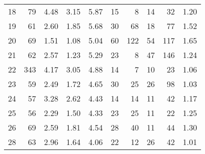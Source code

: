 \begin{tabular}{rrrrrrrrrr}
18 &       79 &                             4.48 &                             3.15 &                             5.87 &              15 &               8 &                                 14 &                              32 &       1.20 \\
19 &       61 &                             2.60 &                             1.85 &                             5.68 &              30 &              68 &                                 18 &                              77 &       1.52 \\
20 &       69 &                             1.51 &                             1.08 &                             5.04 &              60 &             122 &                                 54 &                             117 &       1.65 \\
21 &       62 &                             2.57 &                             1.23 &                             5.29 &              23 &               8 &                                 47 &                             146 &       1.24 \\
22 &      343 &                             4.17 &                             3.05 &                             4.88 &              14 &               7 &                                 10 &                              23 &       1.06 \\
23 &       59 &                             2.49 &                             1.72 &                             4.65 &              30 &              25 &                                 26 &                              98 &       1.03 \\
24 &       57 &                             3.28 &                             2.62 &                             4.43 &              14 &              14 &                                 11 &                              42 &       1.17 \\
25 &       56 &                             2.29 &                             1.50 &                             4.33 &              23 &              25 &                                 11 &                              22 &       1.25 \\
26 &       69 &                             2.59 &                             1.81 &                             4.54 &              28 &              40 &                                 11 &                              44 &       1.30 \\
28 &       63 &                             2.96 &                             1.64 &                             4.06 &              22 &              12 &                                 26 &                              42 &       1.01 \\

\end{tabular}
